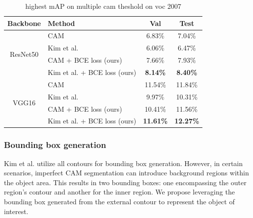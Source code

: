 \documentclass[conference]{IEEEtran}
\begin{document}
\begin{table}[t]
    \centering
    \caption{highest mAP on multiple cam theshold on voc 2007}
    \label{tab:brute_force_cam_threshold_map_voc_2007}
    \begin{tabular}{|c|l|c|c|}
        \hline
        Backbone                     & Method                                              & Val                             & Test                            \\
        \hline
        \multirow[c]{4}{*}{ResNet50} & CAM\cite{zhou2015cnnlocalization}                   & 6.83\%                          & 7.04\%                          \\
                                     & Kim et al. \cite{kim2022bridging}                   & 6.06\%                          & 6.47\%                          \\
                                     & CAM\cite{zhou2015cnnlocalization} + BCE loss (ours) & 7.66\%                          & 7.93\%                          \\
                                     & Kim et al. \cite{kim2022bridging} + BCE loss (ours) & \color{red} \bfseries{8.14\%}   & \color{red} \bfseries{8.40\%}   \\
        \hline
        \multirow[c]{4}{*}{VGG16}    & CAM\cite{zhou2015cnnlocalization}                   & 11.54\%                         & 11.84\%                         \\
                                     & Kim et al. \cite{kim2022bridging}                   & 9.97\%                          & 10.31\%                         \\
                                     & CAM\cite{zhou2015cnnlocalization} + BCE loss (ours) & 10.41\%                         & 11.56\%                         \\
                                     & Kim et al. \cite{kim2022bridging} + BCE loss (ours) & \color{blue} \bfseries{11.61\%} & \color{blue} \bfseries{12.27\%} \\
        \hline
    \end{tabular}
\end{table}

\subsubsection{Bounding box generation}
Kim et al. \cite{kim2022bridging} utilize all contours for bounding box generation. However, in certain scenarios, imperfect CAM segmentation can introduce background regions within the object area. This results in two bounding boxes: one encompassing the outer region's contour and another for the inner region. We propose leveraging the bounding box generated from the external contour to represent the object of interest.
\end{document}
